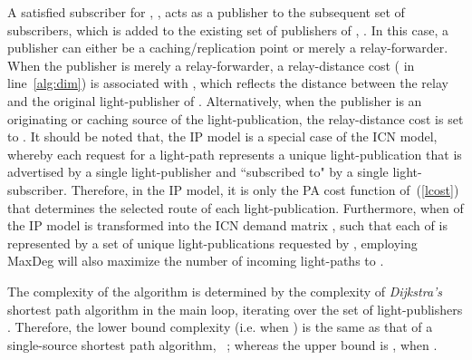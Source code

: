 \documentclass[journal]{IEEEtran}
\begin{document}
A satisfied subscriber for , , acts as a
publisher to the subsequent set of subscribers, which is added
to the existing set of publishers of , . In this case, a
publisher can either be a caching/replication point or merely a
relay-forwarder. When the publisher is merely a relay-forwarder, a relay-distance cost ( in line~\ref{alg:dim}) is associated with , which reflects the distance between the relay and the original light-publisher of .
Alternatively, when the publisher is an originating or caching source of the light-publication, the relay-distance cost is set to .
 It should be noted that, the IP model is a special case of the ICN model,
 whereby each request for a light-path represents a unique
 light-publication that is advertised by a single light-publisher and
 ``subscribed to" by a single light-subscriber. Therefore, in the IP
 model, it is only the PA cost function of~(\ref{lcost}) that
 determines the selected route of each light-publication. Furthermore,
 when  of the IP model is transformed into the ICN demand matrix
 , such that each  of  is represented by a set of
 unique light-publications requested by , employing MaxDeg will
 also maximize the number of incoming light-paths to . 

 The complexity of the algorithm is determined by the complexity of
 \emph{Dijkstra's} shortest path algorithm in the main loop,
 iterating over the set of light-publishers .
 Therefore, the lower bound complexity
 (i.e. when ) is the same as that of a
 single-source shortest path algorithm,
 ~\cite{dij:com}; whereas the upper bound is
 , when
 .
\end{document}
